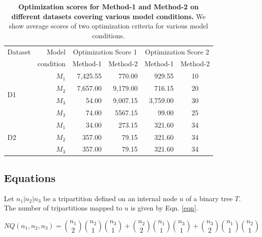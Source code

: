 \documentclass[18pt,a4paper]{article}
\begin{document}
\begin{table}[h!]
	\label{one}
	\caption{\textbf{Optimization scores for Method-1 
	and Method-2 on different datasets covering 
	 various  model  conditions.}
	  We  show  average  scores  of  two  optimization 
	  criteria for various model conditions.\\}
	\begin{tabular}[h]{|l r| r r| r c|}
		\hline
		
		Dataset & 
		Model &
\multicolumn{2}{c}{Optimization Score 1} &
\multicolumn{2}{c}{Optimization Score 2} \\
		\cline{3-6}
			&
		condition &
		 Method-1 &
		Method-2 &
		Method-1 &
		Method-2 \\
		\hline
		\hline
		\multirow{4}{*}{D1}
		&
		$M_1$ &
		7,425.55 &
		770.00 &
		929.55 &
		10 \\
		&
		$M_2$ &
		7,657.00 &
		9,179.00 &
		716.15 &
		20 \\

		&
		$M_3$ &
		54.00 &
		9,007.15 &
		3,759.00 &
		30 \\

		&
		$M_3$ &
		74.00 &
		5567.15 &
		99.00 &
		25 \\
		\hline

		\multirow{3}{*}{D2} &
		$M_1$ &
		34.00 &
		273.15 &
		321.60 &
		34 \\

		&
		$M_2$ &
		357.00 &
		79.15 &
		321.60 &
		34 \\

		&
		$M_3$ &
		357.00 &
		79.15 &
		321.60 &
		34 \\
		\hline

	\end{tabular}
\end{table}

\subsection{Equations}
Let $n_1|n_2|n_3$ 
be  a  tripartition  defined  on  an  internal  node
$u$ of  a  binary  tree $T$. 
The number of tripartitions mapped to $u$ is given by Eqn. \ref{eqn}.

\begin{equation}
	\label{eqn}
	NQ(n_1,n_2,n_3) = \binom{n_1}{2} \binom{n_2}{1}
	\binom{n_3}{1} + \binom{n_2}{2} 
	\binom{n_1}{1} \binom{n_3}{1} + \binom{n_3}{2}
	\binom{n_1}{1} \binom{n_2}{1} 
\end{equation}
\end{document}

